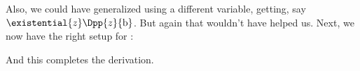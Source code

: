 Also, we could have generalized using a different variable, getting, say $\existential{\variable{z}}\Dpp{\variable{z}}{\constant{b}}$.
But again that wouldn't have helped us. 
Next, we now have the right setup for :
\begin{gproof}[\label{GQDExampleG}]
\end{gproof}
And this completes the derivation. 

